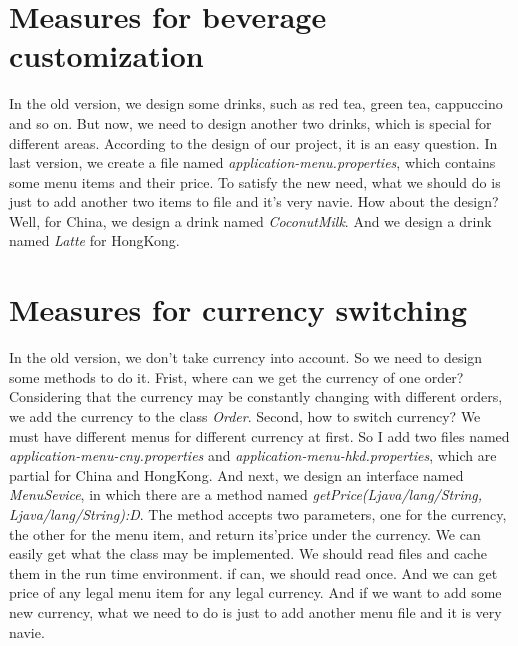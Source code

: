 \documentclass[a4paper]{report}
\begin{document}
\section{Measures for beverage customization}
\par In the old version, we design some drinks, such as red tea, green tea, cappuccino and so on. But now, we need to design another two drinks, which is special for different areas. According to the design of our project, it is an easy question. In last version, we create a file named \emph{application-menu.properties}, which contains some menu items and their price. To satisfy the new need, what we should do is just to add another two items to file and it's very navie. How about the design? Well, for China, we design a drink named \emph{CoconutMilk}. And we design a drink named \emph{Latte} for HongKong.
\section{Measures for currency switching}
\par In the old version, we don't take currency into account. So we need to design some methods to do it. Frist, where can we get the currency of one order? Considering that the currency may be constantly changing with different orders, we add the currency to the class \emph{Order}. Second, how to switch currency? We must have different menus for different currency at first. So I add two files named \emph{application-menu-cny.properties} and \emph{application-menu-hkd.properties}, which are partial for China and HongKong. And next, we design an interface named \emph{MenuSevice}, in which there are a method named \emph{getPrice(Ljava/lang/String, Ljava/lang/String):D}. The method accepts two parameters, one for the currency, the other for the menu item, and return its'price under the currency. We can easily get what the class may be implemented. We should read files and cache them in the run time environment. if can, we should read once. And we can get price of any legal menu item for any legal currency. And if we want to add some new currency, what we need to do is just to add another menu file and it is very navie.
\end{document}

